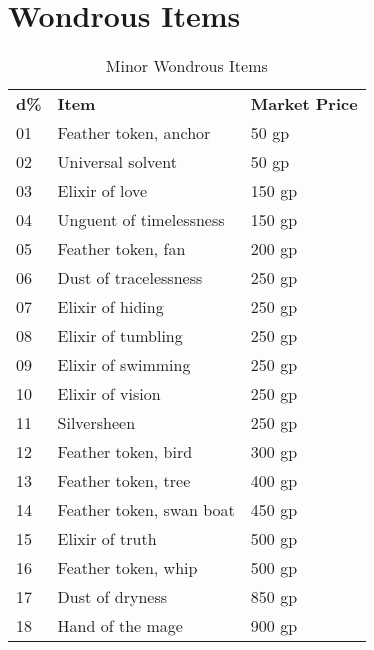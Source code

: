\section{Wondrous Items}

\begin{table}[]
\sffamily
\caption{Minor Wondrous Items}
\setlength{\tabcolsep}{1pt}
\begin{tabularx}{\linewidth}{lXl}
\textbf{d\%} & \textbf{Item}                                        & \textbf{Market Price} \\
01  & Feather token, anchor                       & 50 gp        \\
02  & Universal solvent                           & 50 gp        \\
03  & Elixir of love                              & 150 gp       \\
04  & Unguent of timelessness                     & 150 gp       \\
05  & Feather token, fan                          & 200 gp       \\
06  & Dust of tracelessness                       & 250 gp       \\
07  & Elixir of hiding                            & 250 gp       \\
08  & Elixir of tumbling                          & 250 gp       \\
09  & Elixir of swimming                          & 250 gp       \\
10  & Elixir of vision                            & 250 gp       \\
11  & Silversheen                                 & 250 gp       \\
12  & Feather token, bird                         & 300 gp       \\
13  & Feather token, tree                         & 400 gp       \\
14  & Feather token, swan boat                    & 450 gp       \\
15  & Elixir of truth                             & 500 gp       \\
16  & Feather token, whip                         & 500 gp       \\
17  & Dust of dryness                             & 850 gp       \\
18  & Hand of the mage                            & 900 gp       \\

\end{tabularx}
\end{table}
